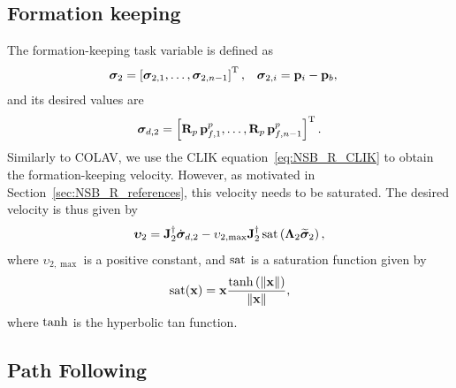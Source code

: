 \subsection{Formation keeping}
\label{sec:NSB_R_formation}
The formation-keeping task variable is defined as
\begin{align}
    \bm{\sigma}_2 &= \left[\bm{\sigma}_{2,1}, \ldots, \bm{\sigma}_{2,n-1}\right]^{\mathrm{T}}, \label{eq:NSB_R_sigma_2} &
    \bm{\sigma}_{2,i} &= \mathbf{p}_i - \mathbf{p}_b,
\end{align}
and its desired values are 
\begin{equation}
    \bm{\sigma}_{d,2} = \left[\mathbf{R}_p\,\mathbf{p}_{f,1}^p, \ldots, \mathbf{R}_p\,\mathbf{p}_{f,n-1}^p\right]^{\mathrm{T}}  .
    \label{eq:NSB_R_sigma_d_2}
\end{equation}
Similarly to COLAV, we use the CLIK equation~\eqref{eq:NSB_R_CLIK} to obtain the formation-keeping velocity.
However, as motivated in Section~\ref{sec:NSB_R_references}, this velocity needs to be saturated.
The desired velocity is thus given by 
\begin{equation}
    \bm{\upsilon}_2 = \mathbf{J}_2^{\dagger}\dot{\bm{\sigma}}_{d,2} - \upsilon_{2, \max}\mathbf{J}_2^{\dagger}\,{\rm sat}\left(\bm{\Lambda}_2\widetilde{\bm{\sigma}}_2\right),
    \label{eq:NSB_R_v_form}
\end{equation}
where $\upsilon_{2, \max}$ is a positive constant, and $\rm sat$ is a saturation function given by 
\begin{equation}
    {\rm sat}(\mathbf{x}) = \mathbf{x} \frac{{\rm tanh}\left(\left\|\mathbf{x}\right\|\right)}{\left\|\mathbf{x}\right\|},
\end{equation}
where $\rm tanh$ is the hyperbolic tan function.

\subsection{Path Following}
\label{sec:NSB_R_LOS}

